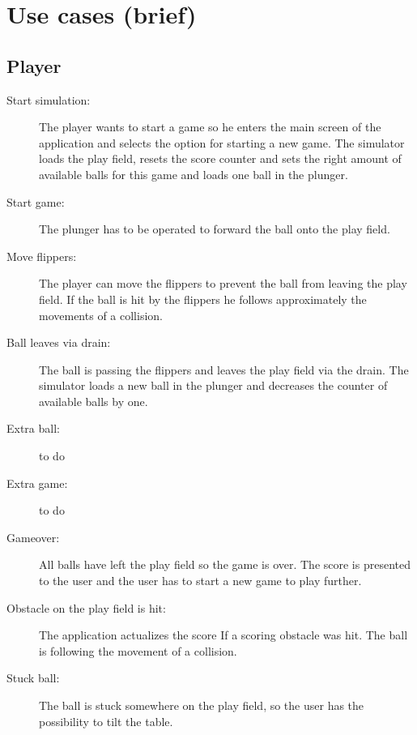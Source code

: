 \documentclass[fontsize=12pt,
               paper=a4,
               twoside=false,
               parskip=half,
               ]{scrartcl}
\begin{document}


\section{Use cases (brief)}

\subsection{Player}

\begin{description}

\item[Start simulation:]   The player wants to start a game so he enters the main screen of the application and selects the option for starting a new game. The simulator loads the play field, resets the score counter and sets the right amount of available balls for this game and loads one ball in the plunger.

\item[Start game:] The plunger has to be operated to forward the ball onto the play field. 

\item[Move flippers:] The player can move the flippers to prevent the ball from leaving the play field. If the ball is hit by the flippers he follows approximately the movements of a collision.

\item[Ball leaves via drain:] The ball is passing the flippers and leaves the play field via the drain. The simulator loads a new ball in the plunger and decreases the counter of available balls by one.

\item[Extra ball:] 
to do

\item[Extra game:]
to do

\item[Gameover:] All balls have left the play field so the game is over. The score is presented to the user and the user has to start a new game to play further.

\item[Obstacle on the play field is hit:] The application actualizes the score If a scoring obstacle  was hit. The ball is following the movement of a collision.

\item[Stuck ball:] The ball is stuck somewhere on the play field, so the user has the possibility to tilt the table.


\end{description}
\end{document}
